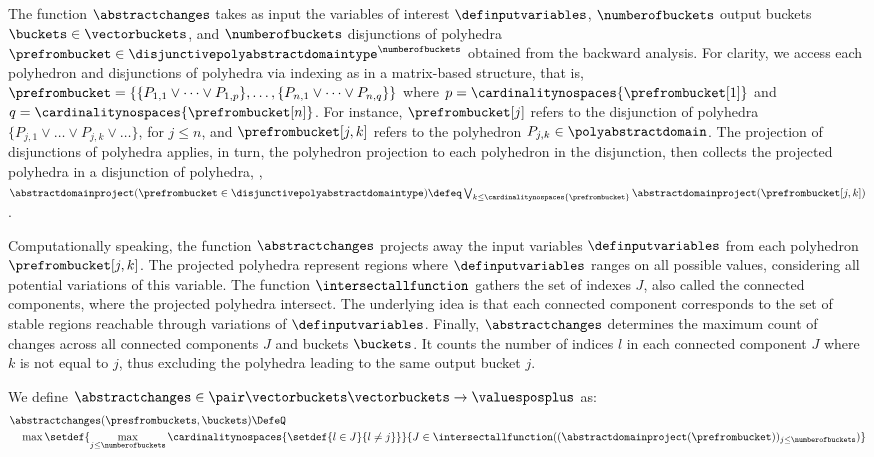 The function $\abstractchanges$ takes as input the variables of interest $\definputvariables$, $\numberofbuckets$ output buckets $\buckets\in\vectorbuckets$, and $\numberofbuckets$ disjunctions of polyhedra $\prefrombucket\in\disjunctivepolyabstractdomaintype^\numberofbuckets$ obtained from the backward analysis.
For clarity, we access each polyhedron and disjunctions of polyhedra via indexing as in a matrix-based structure, that is, $\prefrombucket=\{\{P_{1,1}\vee \dots\vee P_{1,p}\},\dots,\{P_{n,1}\vee \dots\vee P_{n,q}\}\}$ where $p = \cardinalitynospaces{\prefrombucket[1]}$ and $q = \cardinalitynospaces{\prefrombucket[n]}$. For instance, $\prefrombucket[j]$ refers to the disjunction of polyhedra $\{P_{j,1}\vee \dots\vee P_{j,k}\vee \dots\}$, for $j\le n$, and $\prefrombucket[{j, k}]$ refers to the polyhedron $P_{j,k}\in\polyabstractdomain$.
The projection of disjunctions of polyhedra applies, in turn, the polyhedron projection to each polyhedron in the disjunction, then collects the projected polyhedra in a disjunction of polyhedra, \ie, $\abstractdomainproject(\prefrombucket \in \disjunctivepolyabstractdomaintype) \defeq \bigvee_{k \le \cardinalitynospaces{\prefrombucket}} \abstractdomainproject(\prefrombucket[j, k])$.

Computationally speaking, the function $\abstractchanges$ projects away the input variables $\definputvariables$ from each polyhedron $\prefrombucket[{j, k}]$.
The projected polyhedra represent regions where $\definputvariables$ ranges on all possible values, considering all potential variations of this variable.
The function $\intersectallfunction$ gathers the set of indexes $J$, also called the connected components, where the projected polyhedra intersect.
The underlying idea is that each connected component corresponds to the set of stable regions reachable through variations of $\definputvariables$.
%
Finally, $\abstractchanges$ determines the maximum count of changes across all connected components $J$ and buckets $\buckets$.
It counts the number of indices $l$ in each connected component $J$ where $k$ is not equal to $j$, thus excluding the polyhedra leading to the same output bucket $j$.

\begin{definition}[$\abstractchanges$]
  We define $\abstractchanges\in\pair\vectorbuckets\vectorbuckets\to\valuesposplus$ as:
  \begin{align*}
    &\abstractchanges(\presfrombuckets, \buckets) \DefeQ \\
      &\quad \max
      \setdef{
        \max_{j \le \numberofbuckets} \cardinalitynospaces{\setdef{l \in J}{l \neq j}}
      }{
        J \in \intersectallfunction((\abstractdomainproject(\prefrombucket))_{j\le\numberofbuckets})
      }
  \end{align*}
\end{definition}

